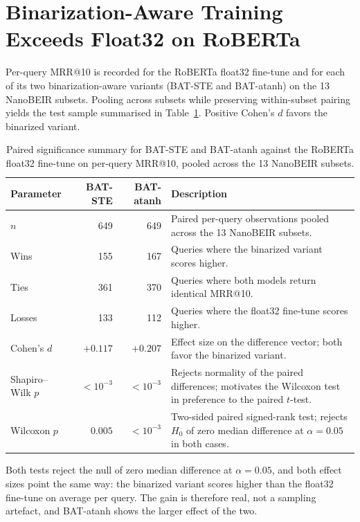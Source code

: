 \section{Binarization-Aware Training Exceeds Float32 on RoBERTa}
\label{sec:significance_bat_roberta}

Per-query MRR@10 is recorded for the RoBERTa float32 fine-tune and
for each of its two binarization-aware variants (BAT-STE and
BAT-atanh) on the 13 NanoBEIR subsets. Pooling across subsets while
preserving within-subset pairing yields the test sample summarised
in Table~\ref{tab:sig_bat_roberta}. Positive Cohen's $d$ favors the
binarized variant.

\begin{table}[h]
    \centering
    \caption[BAT vs float32 on RoBERTa: significance summary]%
    {Paired significance summary for BAT-STE and BAT-atanh against
    the RoBERTa float32 fine-tune on per-query MRR@10, pooled across
    the 13 NanoBEIR subsets.}
    \label{tab:sig_bat_roberta}
    \begin{tabular}{l r r p{}}
        \toprule
        \textbf{Parameter} & \textbf{BAT-STE} & \textbf{BAT-atanh} & \textbf{Description} \\
        \midrule
        $n$               & 649        & 649        & Paired per-query observations pooled across the 13 NanoBEIR subsets. \\
        Wins              & 155        & 167        & Queries where the binarized variant scores higher. \\
        Ties              & 361        & 370        & Queries where both models return identical MRR@10. \\
        Losses            & 133        & 112        & Queries where the float32 fine-tune scores higher. \\
        Cohen's $d$       & $+0.117$   & $+0.207$   & Effect size on the difference vector; both favor the binarized variant. \\
        Shapiro--Wilk $p$ & $<10^{-3}$ & $<10^{-3}$ & Rejects normality of the paired differences; motivates the Wilcoxon test in preference to the paired $t$-test. \\
        Wilcoxon $p$      & $0.005$    & $<10^{-3}$ & Two-sided paired signed-rank test; rejects $H_0$ of zero median difference at $\alpha = 0.05$ in both cases. \\
        \bottomrule
    \end{tabular}
\end{table}

Both tests reject the null of zero median difference at
$\alpha = 0.05$, and both effect sizes point the same way: the
binarized variant scores higher than the float32 fine-tune on
average per query. The gain is therefore real, not a sampling
artefact, and BAT-atanh shows the larger effect of the two.
